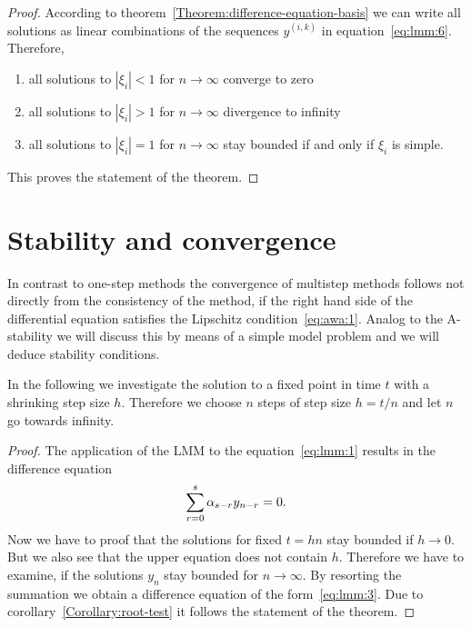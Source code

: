 

\begin{proof}
  According to theorem~\ref{Theorem:difference-equation-basis} we can write all solutions
  as linear combinations of the sequences $y^{(i,k)}$ in
  equation~\eqref{eq:lmm:6}. Therefore,
  \begin{enumerate}
  \item all solutions to $|\xi_i|<1$ for $n\to\infty$ converge to zero
  \item all solutions to $|\xi_i|>1$ for $n\to\infty$ divergence to infinity
  \item all solutions to $|\xi_i|=1$ for $n\to\infty$ stay bounded 
	if and only if $\xi_i$ is simple.
  \end{enumerate}
  This proves the statement of the theorem.
\end{proof}

\section{Stability and convergence}

\begin{remark}
  In contrast to one-step methods the convergence of multistep methods
  follows not directly from the consistency of the method, if the
  right hand side of the differential equation satisfies the Lipschitz
  condition~\eqref{eq:awa:1}.  Analog to the A-stability we will
  discuss this by means of a simple model problem and we will deduce
  stability conditions.
\end{remark}

\begin{remark}
  In the following we investigate the solution to a fixed point in time
  $t$ with a shrinking step size $h$. Therefore we choose $n$
  steps of step size $h = t/n$ and let $n$ go towards infinity.
\end{remark}




\begin{proof}
  The application of the LMM to the equation~\eqref{eq:lmm:1} results
  in the difference equation
  \begin{gather*}
    \sum_{r=0}^{s} \alpha_{s-r} y_{n-r} = 0.
  \end{gather*}
  Now we have to proof that the solutions for fixed $t = h n$ stay
  bounded if $h\to 0$. But we also see that the upper equation does
  not contain $h$. Therefore we have to examine, if the solutions
  $y_n$ stay bounded for $n\to \infty$.  By resorting the summation we
  obtain a difference equation of the form~\eqref{eq:lmm:3}. Due to
  corollary~\ref{Corollary:root-test} it follows the statement of the theorem.
\end{proof}

